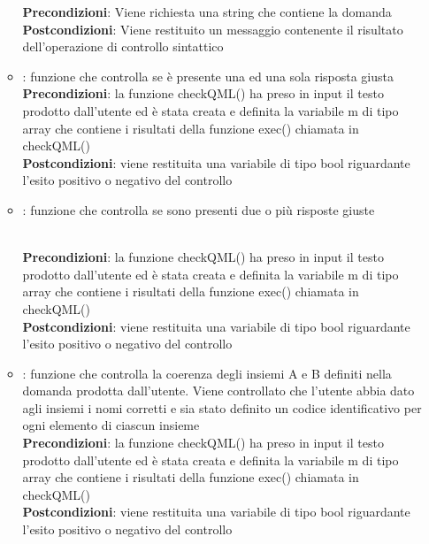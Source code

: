 \begin{itemize}
\begin{itemize}
				\textbf{Precondizioni}: Viene richiesta una string che contiene la domanda\\
				\textbf{Postcondizioni}: Viene restituito un messaggio contenente il risultato dell'operazione di controllo sintattico\\
				
		\item{}: funzione che controlla se è presente una ed una sola risposta giusta\\
			
				
				\textbf{Precondizioni}: la funzione checkQML() ha preso in input il testo prodotto dall'utente ed è stata creata e definita la variabile m di tipo array che contiene i risultati della funzione exec() chiamata in checkQML()\\
				\textbf{Postcondizioni}: viene restituita una variabile di tipo bool riguardante l'esito positivo o negativo del controllo\\
			
		\item{}: funzione che controlla se sono presenti due o più risposte giuste\\
			\
				
				\textbf{Precondizioni}: la funzione checkQML() ha preso in input il testo prodotto dall'utente ed è stata creata e definita la variabile m di tipo array che contiene i risultati della funzione exec() chiamata in checkQML()\\
				\textbf{Postcondizioni}: viene restituita una variabile di tipo bool riguardante l'esito positivo o negativo del controllo\\
			
		\item{}: funzione che controlla la coerenza degli insiemi A e B definiti nella domanda prodotta dall'utente. Viene controllato che l'utente abbia dato agli insiemi i nomi corretti e sia stato definito un codice identificativo per ogni elemento di ciascun insieme\\
			
				\textbf{Precondizioni}: la funzione checkQML() ha preso in input il testo prodotto dall'utente ed è stata creata e definita la variabile m di tipo array che contiene i risultati della funzione exec() chiamata in checkQML()\\
				\textbf{Postcondizioni}: viene restituita una variabile di tipo bool riguardante l'esito positivo o negativo del controllo\\
			

\end{itemize}
\end{itemize}
